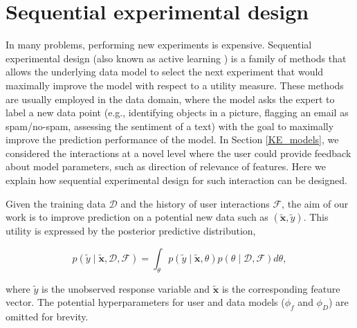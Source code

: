 \documentclass[dissertation,math,vertlayout,pdfa,colorlinks]{aaltoseries}
\newcommand{\bD}{\mathcal{D}}
\newcommand{\bF}{\mathcal{F}}
\begin{document}
\section{Sequential experimental design}\label{AL_and_ED}

In many problems, performing new experiments is expensive. Sequential experimental design \cite{chaloner1995,seeger2008bayesian,settles2010active} (also known as active learning \cite{settles2010active}) is a family of methods that allows the underlying data model to select the next experiment that would maximally improve the model with respect to a utility measure. These methods are usually employed in the data domain, where the model asks the expert to label a new data point (e.g., identifying objects in a picture, flagging an email as spam/no-spam, assessing the sentiment of a text) with the goal to maximally improve the prediction performance of the model. In Section \ref{KE_models}, we considered the interactions at a novel level where the user could provide feedback about model parameters, such as direction of relevance of features. Here we explain how sequential experimental design for such interaction can be designed.


Given the training data $\bD$ and the history of user interactions $\bF$, the aim of our work is to improve prediction on a potential new data such as $(\tilde{\bm{x}},\tilde{y})$. This utility is expressed by the posterior predictive distribution,


\begin{equation}\label{Eq:post_pred_data_fb}
p(\tilde{y} \mid \tilde{\bm{x}}, \bD,\bF) = \int_{\theta} p(\tilde{y}  \mid \tilde{\bm{x}}, \theta)p(\theta \mid \bD, \bF)d\theta,
\end{equation}

\noindent where $\tilde{y}$ is the unobserved response variable and  $\tilde{\bm{x}}$ is the corresponding feature vector. %
The potential hyperparameters for user and data models ($\phi_f$ and $\phi_D$) are omitted for brevity. 
\end{document}
